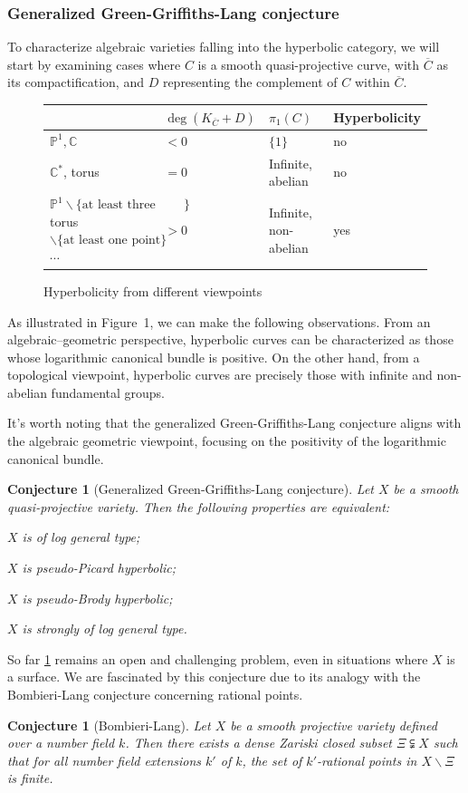\documentclass[english]{amsproc}
\theoremstyle{plain}
\newtheorem{conjecture}[thm]{Conjecture}
\theoremstyle{definition}
\theoremstyle{remark}
\theoremstyle{plain}
\numberwithin{equation}{thm} %
\begin{document}
\subsubsection{Generalized Green-Griffiths-Lang conjecture}
To characterize algebraic varieties falling into the hyperbolic category, we will start by examining cases where $C$ is a smooth quasi-projective curve, with $\overline{C}$ as its compactification, and $D$ representing the complement of $C$ within $\overline{C}$.   
\begin{figure}\label{figure}
	\centering
	\caption{Hyperbolicity from different viewpoints}
	\begin{tabular}{| m{5cm} | m{2.5cm} | m{2cm} | m{3cm} | }
		\hline
		& $\deg (K_{\overline{C}}+D)$ & $\pi_1(C)$ & Hyperbolicity \\
		\hline\hline
		$\mathbb{P}^1, \mathbb{C}$ & $<0$ & $\{1\}$ & no \\
		\hline
		$\mathbb{C}^*$, torus & $=0$ & Infinite, abelian & no \\
		\hline
		$\mathbb{P}^1\backslash \{\text{at least three points}\}$  torus$\backslash \{\text{at least one point}\}$ $\cdots$ & $>0$ & Infinite, non-abelian & yes \\
		\hline
	\end{tabular}
\end{figure}
As illustrated in Figure~1, we can make the following observations. 
From an algebraic–geometric perspective, hyperbolic curves can be characterized as those whose 
logarithmic canonical bundle is positive. 
On the other hand, from a topological viewpoint, hyperbolic curves are precisely those with 
infinite and non-abelian fundamental groups.

It's worth noting that the generalized Green-Griffiths-Lang conjecture aligns with the algebraic geometric viewpoint, focusing on the positivity of the logarithmic canonical bundle.
\begin{conjecture}[Generalized  Green-Griffiths-Lang conjecture]\label{conj:GGL}
	Let $X$ be a smooth quasi-projective variety.  Then the following properties are equivalent:
	\begin{thmlist} 
		\item  $X$ is of log general type;
		\item  $X$ is pseudo-Picard hyperbolic;
		\item  $X$ is pseudo-Brody hyperbolic;
		\item $X$ is  {strongly of log general type}.
	\end{thmlist}
\end{conjecture}
So far \cref{conj:GGL} remains an open and challenging problem, even in situations where $X$ is a surface. We   are fascinated by this conjecture   due to its analogy with the Bombieri-Lang conjecture concerning rational points. 
\begin{conjecture}[Bombieri-Lang]
	Let $X$ be a smooth projective variety defined over a number field $k$. Then there exists a dense Zariski closed subset $\Xi\subsetneqq X$ such that  for all   number field extensions  $k'$ of $k$, the set of $k'$-rational points in $X\backslash \Xi$ is finite. 
\end{conjecture}
\end{document}
